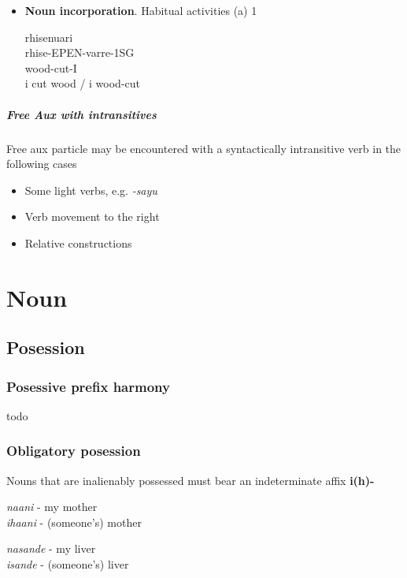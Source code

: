 \documentclass[8pt]{book}
\begin{document}
\begin{itemize}
\item \textbf{Noun incorporation}. Habitual activities (a)
1  
  \begin{xlista}
    \ex rhisenuari \\
        rhise-EPEN-varre-1SG \\
        wood-cut-I \\
        i cut wood / i wood-cut
  \end{xlista}

\end{itemize}

\paragraph{Free Aux with intransitives}
Free aux particle may be encountered with a syntactically intransitive verb in the following cases

\begin{itemize}
\item Some light verbs, e.g. \textit{-sayu} 
\item Verb movement to the right
\item Relative constructions
\end{itemize}


\chapter{Noun}
\section{Posession}

\subsection{Posessive prefix harmony}

todo

\subsection{Obligatory posession}

Nouns that are inalienably possessed must bear an indeterminate affix \textbf{i(h)-}

\begin{exe}
\ex \textit{naani} - my mother \\
 \textit{ihaani} - (someone's) mother

\ex \textit{nasande} - my liver \\
 \textit{isande} - (someone's) liver

\end{exe}
\end{document}
